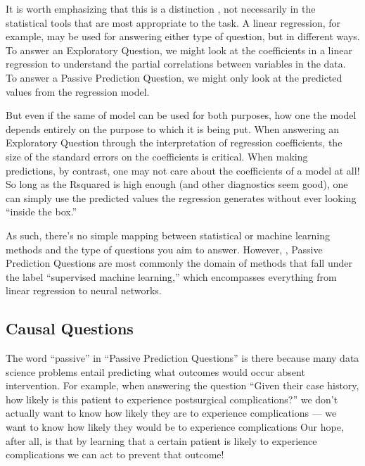 \documentclass[letterpaper,10pt,english]{jupyterBook}
\begin{document}
\sphinxAtStartPar
It is worth emphasizing that this is a distinction , not necessarily in the statistical tools that are most appropriate to the task. A linear regression, for example, may be used for answering either type of question, but in different ways. To answer an Exploratory Question, we might look at the coefficients in a linear regression to understand the partial correlations between variables in the data. To answer a Passive Prediction Question, we might only look at the predicted values from the regression model.

\sphinxAtStartPar
But even if the same  of model can be used for both purposes, how one  the model depends entirely on the purpose to which it is being put. When answering an Exploratory Question through the interpretation of regression coefficients, the size of the standard errors on the coefficients is critical. When making predictions, by contrast, one may not care about the coefficients of a model at all! So long as the R\sphinxhyphen{}squared is high enough (and other diagnostics seem good), one can simply use the predicted values the regression generates without ever looking “inside the box.”

\sphinxAtStartPar
As such, there’s no simple mapping between statistical or machine learning methods and the type of questions you aim to answer. However, , Passive Prediction Questions are most commonly the domain of methods that fall under the label “supervised machine learning,” which encompasses everything from linear regression to neural networks.


\subsection{Causal Questions}
\label{\detokenize{10_introduction/10_our_approach:causal-questions}}
\sphinxAtStartPar
The word “passive” in “Passive Prediction Questions” is there because many data science problems entail predicting what outcomes would occur absent intervention. For example, when answering the question “Given their case history, how likely is this patient to experience post\sphinxhyphen{}surgical complications?” we don’t actually want to know how likely they are to experience complications — we want to know how likely they would be to experience complications  Our hope, after all, is that by learning that a certain patient is likely to experience complications we can act to prevent that outcome!
\end{document}
